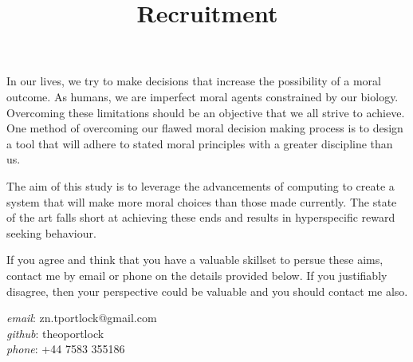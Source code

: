 \documentclass[12pt]{article}
\title{Recruitment}
\date{\vspace{-5ex}}
\begin{document}
\maketitle

In our lives, we try to make decisions that increase the possibility of a moral outcome.
As humans, we are imperfect moral agents constrained by our biology.
Overcoming these limitations should be an objective that we all strive to achieve.
One method of overcoming our flawed moral decision making process is to design a tool that will adhere to stated moral principles with a greater discipline than us.

\vspace{5mm}
\noindent
The aim of this study is to leverage the advancements of computing to create a system that will make more moral choices than those made currently.
The state of the art falls short at achieving these ends and results in hyperspecific reward seeking behaviour.

\vspace{5mm}
\noindent
If you agree and think that you have a valuable skillset to persue these aims, contact me by email or phone on the details provided below.
If you justifiably disagree, then your perspective could be valuable and you should contact me also.

\vspace{5mm}
\noindent
\emph{email}:	zn.tportlock@gmail.com \\
\emph{github}:	theoportlock \\
\emph{phone}:	+44 7583 355186
\end{document}
